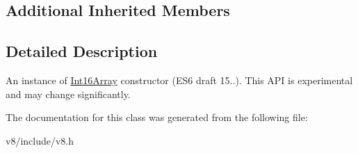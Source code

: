 \subsection*{Additional Inherited Members}


\subsection{Detailed Description}
An instance of \hyperlink{classv8_1_1Int16Array}{Int16\+Array} constructor (E\+S6 draft 15..). This A\+P\+I is experimental and may change significantly. 

The documentation for this class was generated from the following file\+:\begin{DoxyCompactItemize}
\item 
v8/include/v8.\+h\end{DoxyCompactItemize}
